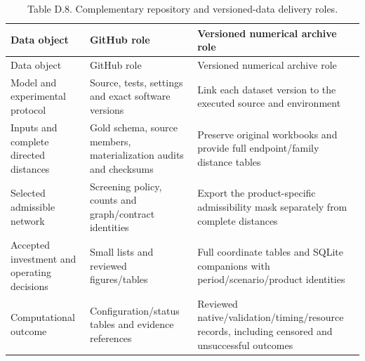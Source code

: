 \documentclass[
  english,
  11pt,
  a4paper,
]{article}
\begin{document}
\begin{longtable}[]{@{}
  >{\raggedright\arraybackslash}p{}
  >{\raggedright\arraybackslash}p{}
  >{\raggedright\arraybackslash}p{}@{}}
\caption{Table D.8. Complementary repository and versioned-data delivery
roles.}\tabularnewline
\toprule\noalign{}
\begin{minipage}[b]{\linewidth}\raggedright
Data object
\end{minipage} & \begin{minipage}[b]{\linewidth}\raggedright
GitHub role
\end{minipage} & \begin{minipage}[b]{\linewidth}\raggedright
Versioned numerical archive role
\end{minipage} \\
\midrule\noalign{}
\endfirsthead
\toprule\noalign{}
\begin{minipage}[b]{\linewidth}\raggedright
Data object
\end{minipage} & \begin{minipage}[b]{\linewidth}\raggedright
GitHub role
\end{minipage} & \begin{minipage}[b]{\linewidth}\raggedright
Versioned numerical archive role
\end{minipage} \\
\midrule\noalign{}
\endhead
\bottomrule\noalign{}
\endlastfoot
Model and experimental protocol & Source, tests, settings and exact
software versions & Link each dataset version to the executed source and
environment \\
Inputs and complete directed distances & Gold schema, source members,
materialization audits and checksums & Preserve original workbooks and
provide full endpoint/family distance tables \\
Selected admissible network & Screening policy, counts and
graph/contract identities & Export the product-specific admissibility
mask separately from complete distances \\
Accepted investment and operating decisions & Small lists and reviewed
figures/tables & Full coordinate tables and SQLite companions with
period/scenario/product identities \\
Computational outcome & Configuration/status tables and evidence
references & Reviewed native/validation/timing/resource records,
including censored and unsuccessful outcomes \\
\end{longtable}
\end{document}
